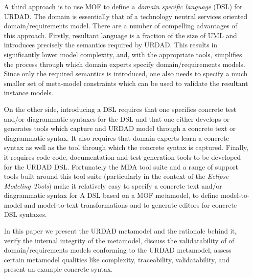 A third approach is to use MOF to define a {\em domain specific language} (DSL) for URDAD. The domain is essentially that of a technology neutral services oriented domain/requirements model. There are a number of compelling advantages of this approach. Firstly, resultant language is a fraction of the size of UML and introduces precisely the semantics required by URDAD. This results in significantly lower model complexity, and, with the appropriate tools, simplifies the process through which domain experts specify domain/requirements models. Since only the required semantics is introduced, one also needs to specify a much smaller set of meta-model constraints which can be used to validate the resultant instance models.

On the other side, introducing a DSL requires that one specifies concrete test and/or diagrammatic syntaxes for the DSL and that one either develops or generates tools which capture and URDAD model through a concrete text or diagrammatic syntax. It also requires that domain experts learn a concrete syntax as well as the tool through which the concrete syntax is captured. Finally, it requires code code, documentation and test generation tools to be developed for the URDAD DSL. Fortunately the MDA tool suite and a range of support tools built around this tool suite (particularly in the context of the {\em Eclipse Modeling Tools}) make it relatively easy to specify a concrete text and/or diagrammatic syntax for A DSL based on a MOF metamodel, to define model-to-model and model-to-text transformations and to generate editors for concrete DSL syntaxes.

In this paper we present the URDAD metamodel and the rationale behind it, verify the internal integrity of the metamodel, discuss the validatability of of domain/requirements models conforming to the URDAD metamodel, assess certain metamodel qualities like complexity, traceability, validatability, and present an example concrete syntax.

